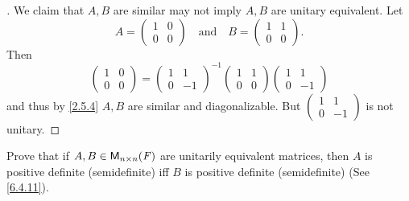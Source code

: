 \begin{proof}[]
  We claim that \(A, B\) are similar may not imply \(A, B\) are unitary equivalent.
  Let
  \[
    A = \begin{pmatrix}
      1 & 0 \\
      0 & 0
    \end{pmatrix} \quad \text{and} \quad B = \begin{pmatrix}
      1 & 1 \\
      0 & 0
    \end{pmatrix}.
  \]
  Then
  \[
    \begin{pmatrix}
      1 & 0 \\
      0 & 0
    \end{pmatrix} = \begin{pmatrix}
      1 & 1  \\
      0 & -1
    \end{pmatrix}^{-1} \begin{pmatrix}
      1 & 1 \\
      0 & 0
    \end{pmatrix} \begin{pmatrix}
      1 & 1  \\
      0 & -1
    \end{pmatrix}
  \]
  and thus by \cref{2.5.4} \(A, B\) are similar and diagonalizable.
  But \(\begin{pmatrix}
    1 & 1  \\
    0 & -1
  \end{pmatrix}\) is not unitary.
\end{proof}

\begin{ex}\label{ex:6.5.14}
  Prove that if \(A, B \in \ms[n][n][\F]\) are unitarily equivalent matrices, then \(A\) is positive definite (semidefinite) iff \(B\) is positive definite (semidefinite)
  (See \cref{6.4.11}).
\end{ex}

